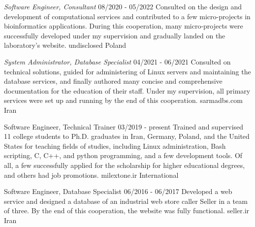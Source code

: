 \documentclass[a4paper,12pt]{memoir} %
\begin{document}
{\textit{Software Engineer, Consultant}}
{08/2020 - 05/2022}
{Consulted on the design and development of computational services and contributed to a few micro-projects in bioinformatics applications. During this cooperation, many micro-projects were successfully developed under my supervision and gradually landed on the laboratory’s website.}
{undisclosed}
{Poland}


{\textit{System Administrator, Database Specialist}}
{04/2021 - 06/2021}
{Consulted on technical solutions, guided for administering of Linux servers and maintaining the database services, and finally authored many concise and comprehensive documentation for the education of their staff.
Under my supervision, all primary services were set up and running by the end of this cooperation.}
{sarmadbs.com}
{Iran}


{Software Engineer, Technical Trainer}
{03/2019 - present}
{Trained and supervised 11 college students to Ph.D. graduates in Iran, Germany, Poland, and the United States for teaching fields of studies, including Linux administration, Bash scripting, C, C++, and python programming, and a few development tools.
Of all, a few successfully applied for the scholarship for higher educational degrees, and others had job promotions.}
{milextone.ir}
{International}


{Software Engineer, Database Specialist}
{06/2016 - 06/2017}
{Developed a web service and designed a database of an industrial web store caller Seller in a team of three.
By the end of this cooperation, the website was fully functional.}
{seller.ir}
{Iran}


\Sep %

\end{document}
